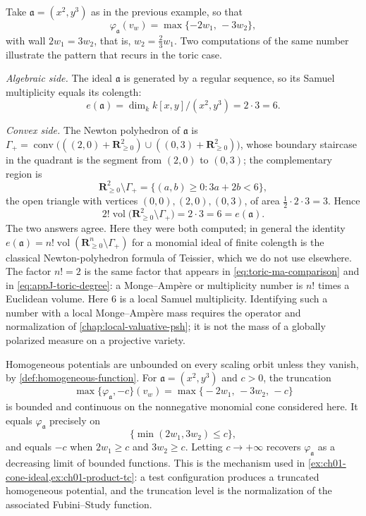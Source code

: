 \begin{example}
\label{ex:ch08-monomial-multiplicity}
Take $\mathfrak a=(x^2,y^3)$ as in the previous example, so that
\[
 \varphi_{\mathfrak a}(v_w)=\max\{-2w_1,\,-3w_2\} ,
\]
with wall $2w_1=3w_2$, that is, $w_2=\tfrac23w_1$.  Two computations of the
same number illustrate the pattern that recurs in the toric case.

\emph{Algebraic side.}  The ideal $\mathfrak a$ is generated by a regular
sequence, so its Samuel multiplicity equals its colength:
\[
 e(\mathfrak a)=\dim_kk[x,y]/(x^2,y^3)=2\cdot3=6 .
\]

\emph{Convex side.}  The Newton polyhedron of $\mathfrak a$ is
$\Gamma_+=\operatorname{conv}\bigl(((2,0)+\mathbf R^2_{\geq0})\cup
((0,3)+\mathbf R^2_{\geq0})\bigr)$, whose boundary staircase in the quadrant
is the segment from $(2,0)$ to $(0,3)$; the complementary region is
\[
 \mathbf R^2_{\geq0}\setminus\Gamma_+
 =\{(a,b)\geq0:3a+2b<6\} ,
\]
the open triangle with vertices $(0,0),(2,0),(0,3)$, of area
$\tfrac12\cdot2\cdot3=3$.  Hence
\[
 2!\operatorname{vol}\bigl(\mathbf R^2_{\geq0}\setminus\Gamma_+\bigr)
 =2\cdot3=6=e(\mathfrak a) .
\]
The two answers agree.  Here they were both computed; in general the
identity $e(\mathfrak a)=n!\operatorname{vol}(\mathbf R^n_{\geq0}
\setminus\Gamma_+)$ for a monomial ideal of finite colength is the classical
Newton-polyhedron formula of Teissier, which we do not use elsewhere.  The factor $n!=2$ is the same factor that appears in
\eqref{eq:toric-ma-comparison} and in \eqref{eq:appJ-toric-degree}: a
Monge--Amp\`ere or multiplicity number is $n!$ times a Euclidean volume.
Here $6$ is a local Samuel multiplicity.  Identifying such a number with a
local Monge--Amp\`ere mass requires the operator and normalization of
\cref{chap:local-valuative-psh}; it is not the mass of a globally polarized
measure on a projective variety.
\end{example}

\begin{example}
\label{ex:ch08-truncation}
Homogeneous potentials are unbounded on every scaling orbit unless they
vanish, by \cref{def:homogeneous-function}.  For $\mathfrak a=(x^2,y^3)$ and
$c>0$, the truncation
\[
 \max\{\varphi_{\mathfrak a},-c\}(v_w)
 =\max\bigl\{-2w_1,\,-3w_2,\,-c\bigr\}
\]
is bounded and continuous on the nonnegative monomial cone considered here.
It equals $\varphi_{\mathfrak a}$ precisely on
\[
                  \{\min(2w_1,3w_2)\le c\},
\]
and equals $-c$ when $2w_1\ge c$ and $3w_2\ge c$.  Letting
$c\to+\infty$ recovers $\varphi_{\mathfrak a}$ as a decreasing limit of
bounded functions.  This is the mechanism used in
\cref{ex:ch01-cone-ideal,ex:ch01-product-tc}: a test configuration produces a
truncated homogeneous potential, and the truncation level is the
normalization of the associated Fubini--Study function.
\end{example}


